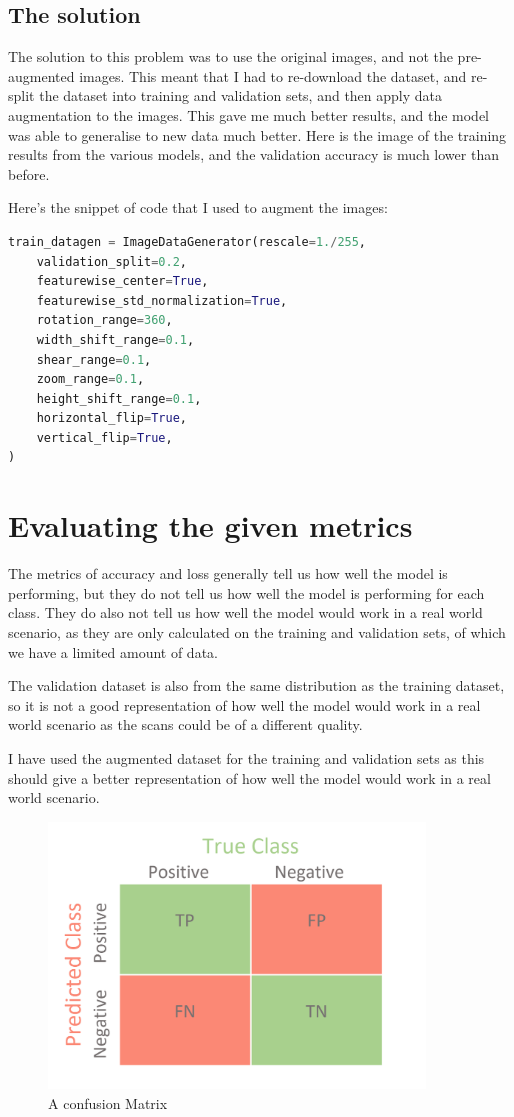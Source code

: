 \documentclass[]{final_report}
\begin{document}
\pagebreak

\subsection{The solution}
The solution to this problem was to use the original images, and not the pre-augmented images.
This meant that I had to re-download the dataset, and re-split the dataset into training and validation sets,
and then apply data augmentation to the images. This gave me much better results, and the model was able to generalise
to new data much better. Here is the image of the training results from the various models, and the validation accuracy is much lower than before.

Here's the snippet of code that I used to augment the images:
\begin{lstlisting}[language=Python]
train_datagen = ImageDataGenerator(rescale=1./255,
    validation_split=0.2,
    featurewise_center=True,
    featurewise_std_normalization=True,
    rotation_range=360,
    width_shift_range=0.1,
    shear_range=0.1,
    zoom_range=0.1,
    height_shift_range=0.1,
    horizontal_flip=True,
    vertical_flip=True,
)
\end{lstlisting}

\pagebreak

\section{Evaluating the given metrics}
The metrics of accuracy and loss generally tell us how well the model is performing,
but they do not tell us how well the model is performing for each class.
They do also not tell us how well the model would work in a real world scenario, 
as they are only calculated on the training and validation sets, of which we have a limited amount of data.

The validation dataset is also from the same distribution as the training dataset, 
so it is not a good representation of how well the model would work in a real world scenario 
as the scans could be of a different quality.

I have used the augmented dataset for the training and validation sets as this 
should give a better representation of how well the model would work in a real world scenario.

\begin{figure}[ht!]
  \centering
  \includegraphics[width=100mm]{images/ConfusionMatrix.png}
  \caption{A confusion Matrix\cite{ConfusionMatrix}}
\end{figure}
\pagebreak
\end{document}
